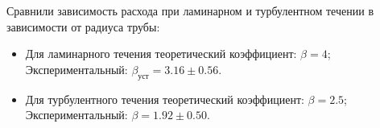 \documentclass[a4paper,12pt]{article}
\theoremstyle{definition}
\begin{document}
	Сравнили зависимость расхода при  ламинарном и турбулентном течении в зависимости от радиуса трубы:
	\begin{itemize}
		\item Для ламинарного течения теоретический коэффициент: $\beta = 4$; Экспериментальный: $\beta_{\text{уст}} = 3.16\pm0.56.$
		\item Для турбулентного течения теоретический коэффициент: $\beta = 2.5$; Экспериментальный: $\beta = 1.92\pm0.50.$
	\end{itemize}
	
	
	
	
	
	
	
	
	
	
	
\end{document}

